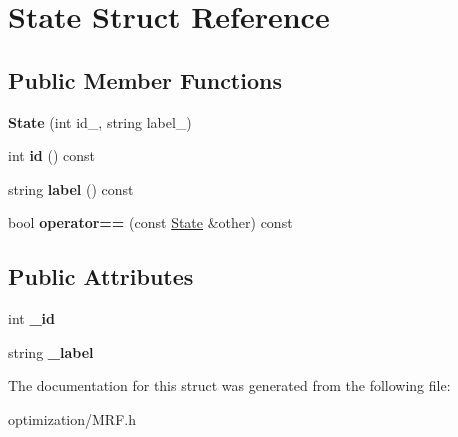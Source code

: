 \hypertarget{struct_state}{
\section{State Struct Reference}
\label{struct_state}
}
\subsection*{Public Member Functions}
\begin{DoxyCompactItemize}
\item 
\hypertarget{struct_state_aa536880320a9aff707fb1e6aab3f58d4}{
{\bfseries State} (int id\_\-, string label\_\-)}
\label{struct_state_aa536880320a9aff707fb1e6aab3f58d4}

\item 
\hypertarget{struct_state_aea25c6702974d1ac86358b4ba96d7891}{
int {\bfseries id} () const }
\label{struct_state_aea25c6702974d1ac86358b4ba96d7891}

\item 
\hypertarget{struct_state_a2809d0a34cd576cc5daaa7a6d0ffb2b5}{
string {\bfseries label} () const }
\label{struct_state_a2809d0a34cd576cc5daaa7a6d0ffb2b5}

\item 
\hypertarget{struct_state_a6687a56382a022034927ba43aad39524}{
bool {\bfseries operator==} (const \hyperlink{struct_state}{State} \&other) const }
\label{struct_state_a6687a56382a022034927ba43aad39524}

\end{DoxyCompactItemize}
\subsection*{Public Attributes}
\begin{DoxyCompactItemize}
\item 
\hypertarget{struct_state_ae0482e3d4b3db023647833efd344831a}{
int {\bfseries \_\-id}}
\label{struct_state_ae0482e3d4b3db023647833efd344831a}

\item 
\hypertarget{struct_state_a1bf6100c59d50bc94ba781230a85a2e5}{
string {\bfseries \_\-label}}
\label{struct_state_a1bf6100c59d50bc94ba781230a85a2e5}

\end{DoxyCompactItemize}


The documentation for this struct was generated from the following file:\begin{DoxyCompactItemize}
\item 
optimization/MRF.h\end{DoxyCompactItemize}
